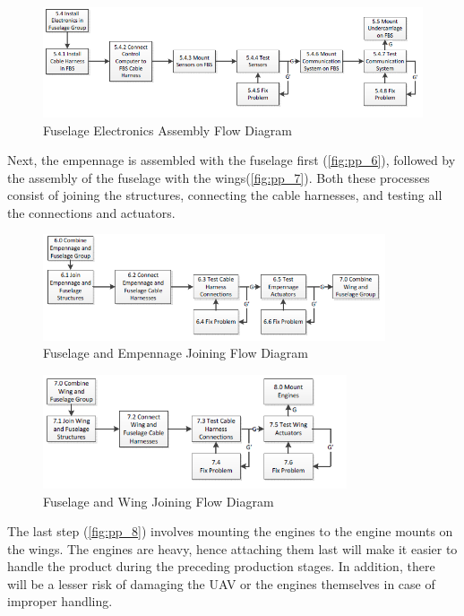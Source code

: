 \begin{figure}[H]
    \centering
    \includegraphics[width=\textwidth]{Production/Figures/54}
    \caption{Fuselage Electronics Assembly Flow Diagram}
    \label{fig:pp_5}
\end{figure}

Next, the empennage is assembled with the fuselage first (\autoref{fig:pp_6}), followed by the assembly of the fuselage with the wings(\autoref{fig:pp_7}). Both these processes consist of joining the structures, connecting the cable harnesses, and testing all the connections and actuators.

\begin{figure}[H]
    \centering
    \includegraphics[width=0.9\textwidth]{Production/Figures/60}
    \caption{Fuselage and Empennage Joining Flow Diagram}
    \label{fig:pp_6}
\end{figure}

\begin{figure}[H]
    \centering
    \includegraphics[width=0.8\textwidth]{Production/Figures/70}
    \caption{Fuselage and Wing Joining Flow Diagram}
    \label{fig:pp_7}
\end{figure}

The last step (\autoref{fig:pp_8}) involves mounting the engines to the engine mounts on the wings. The engines are heavy, hence attaching them last will make it easier to handle the product during the preceding production stages. In addition, there will be a lesser risk of damaging the UAV or the engines themselves in case of improper handling.

